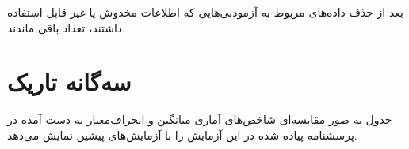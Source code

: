 بعد از حذف داده‌های مربوط به آزمودنی‌هایی که اطلاعات مخدوش یا غیر قابل استفاده داشتند، تعداد
\CleanedSampleSize
باقی ماندند.

\section{سه‌گانه تاریک}
جدول 
\CompareDarkTriadStatisticsRef
به صور مقایسه‌ای 
شاخص‌های آماری میانگین و انحراف‌معیار به دست آمده در پرسشنامه پیاده شده در این آزمایش 
را با آزمایش‌های پیشین نمایش می‌دهد. 

\CompareDarkTriadStatisticsCustomTableCommand


\begin{landscape}
    \newcommand{
    \StyledTableFromDF
}[0]{
	\eqref{tab:StyledTableFromDF}
}
\newcommand{
    \StyledTableFromDFCommand
}[0]{
	\begin{table}
\centering
\caption{Selected stock correlation and simple statistics.}
\begin{tabular}{lllrrrrrrrrl}
\toprule
 &  &  & \multicolumn{4}{|c|}{Equity} & \multicolumn{4}{|c|}{Stats} & Rating \\
 &  &  & \multicolumn{2}{|c|}{Energy} & \multicolumn{2}{|c|}{Consumer} & \multicolumn{4}{|c|}{} &  \\
 &  &  & \rotatebox{45}{BP} & \rotatebox{45}{Shell} & \rotatebox{45}{H&M} & \rotatebox{45}{Unilever} & \rotatebox{45}{Std Dev} & \rotatebox{45}{Variance} & \rotatebox{45}{52w High} & \rotatebox{45}{52w Low} & \rotatebox{45}{} \\
\midrule
\multirow[c]{4}{*}{Equity} & \multirow[c]{2}{*}{Energy} & BP & {\cellcolor[HTML]{FCFFA4}} \color[HTML]{000000} 1.00 & {\cellcolor[HTML]{FCA50A}} \color[HTML]{000000} 0.80 & {\cellcolor[HTML]{EB6628}} \color[HTML]{F1F1F1} 0.66 & {\cellcolor[HTML]{F68013}} \color[HTML]{F1F1F1} 0.72 & 32.2 & 1,034.8 & 335.1 & 240.9 & \color[HTML]{33FF85} \bfseries BUY \\
 &  & Shell & {\cellcolor[HTML]{FCA50A}} \color[HTML]{000000} 0.80 & {\cellcolor[HTML]{FCFFA4}} \color[HTML]{000000} 1.00 & {\cellcolor[HTML]{F1731D}} \color[HTML]{F1F1F1} 0.69 & {\cellcolor[HTML]{FCA108}} \color[HTML]{000000} 0.79 & 1.9 & 3.5 & 14.1 & 19.8 & \color[HTML]{FFDD33} \bfseries HOLD \\
\cline{2-12}
 & \multirow[c]{2}{*}{Consumer} & H&M & {\cellcolor[HTML]{EB6628}} \color[HTML]{F1F1F1} 0.66 & {\cellcolor[HTML]{F1731D}} \color[HTML]{F1F1F1} 0.69 & {\cellcolor[HTML]{FCFFA4}} \color[HTML]{000000} 1.00 & {\cellcolor[HTML]{FAC42A}} \color[HTML]{000000} 0.86 & 7.0 & 49.0 & 210.9 & 140.6 & \color[HTML]{33FF85} \bfseries BUY \\
 &  & Unilever & {\cellcolor[HTML]{F68013}} \color[HTML]{F1F1F1} 0.72 & {\cellcolor[HTML]{FCA108}} \color[HTML]{000000} 0.79 & {\cellcolor[HTML]{FAC42A}} \color[HTML]{000000} 0.86 & {\cellcolor[HTML]{FCFFA4}} \color[HTML]{000000} 1.00 & 213.8 & 45,693.3 & 2,807.0 & 3,678.0 & \color[HTML]{FF5933} \bfseries SELL \\
\cline{1-12} \cline{2-12}
\bottomrule
\end{tabular}
\end{table}

}
\end{landscape}

